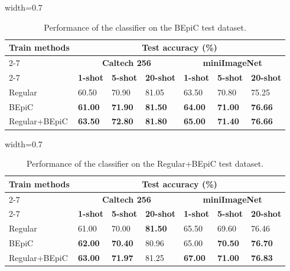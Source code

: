 \begin{table}[!ht]
\centering
\caption{Performance of the classifier on the BEpiC test dataset.}
\begin{adjustbox}{width=0.7\linewidth}
\renewcommand{\arraystretch}{1.5} 
\begin{tabular}{|l|l|l|l|l|l|l|}
 \hline
\multirow{3}{*}{\textbf{Train methods}} & \multicolumn{6}{c|}{\textbf{Test accuracy (\%)}}                         \\  \cline{2-7}
                               & \multicolumn{3}{c|}{\textbf{Caltech 256}} & \multicolumn{3}{|c|}{\textbf{miniImageNet}} \\ \cline{2-7}
                               & \textbf{1-shot}  & \textbf{5-shot}  & \textbf{20-shot} & \textbf{1-shot}    & \textbf{5-shot}   & \textbf{20-shot}   \\  \hline
Regular                        & 60.50    & 70.90    & 81.05   & 63.50      & 70.80     & 75.25     \\  \hline
BEpiC                          & \textbf{61.00}      & \textbf{71.90}    & \textbf{81.50}    & \textbf{64.00}        & \textbf{71.00}       & \textbf{76.66}     \\  \hline
Regular+BEpiC                  & \textbf{63.50}    & \textbf{72.80}    & \textbf{81.80}    & \textbf{65.00}        & \textbf{71.40}     & \textbf{76.66}    \\  \hline
\end{tabular}
\end{adjustbox}
\label{table:bepiC}
\end{table}

\begin{table}[!ht]
\centering
\caption{Performance of the classifier on the Regular+BEpiC test dataset.}
\begin{adjustbox}{width=0.7\linewidth}
\renewcommand{\arraystretch}{1.5} 
\begin{tabular}{|l|l|l|l|l|l|l|}
 \hline
\multirow{3}{*}{\textbf{Train methods}} & \multicolumn{6}{c|}{\textbf{Test accuracy (\%)}}                         \\  \cline{2-7}
                               & \multicolumn{3}{c|}{\textbf{Caltech 256}} & \multicolumn{3}{|c|}{\textbf{miniImageNet}} \\ \cline{2-7}
                               & \textbf{1-shot}  & \textbf{5-shot}  & \textbf{20-shot} & \textbf{1-shot}    & \textbf{5-shot}   & \textbf{20-shot}   \\  \hline
Regular                        & 61.00    & 70.00    & \textbf{81.50}   & 65.50  & 69.60     & 76.46     \\  \hline
BEpiC                          & \textbf{62.00}    & \textbf{70.40}  & 80.96  & 65.00    & \textbf{70.50}     & \textbf{76.70}     \\  \hline
Regular+BEpiC                  & \textbf{63.00}    & \textbf{71.97} & 81.25  & \textbf{67.00}    & \textbf{71.00}       & \textbf{76.83}    \\  \hline
\end{tabular}
\end{adjustbox}
\label{table:reg+bepiC}
\end{table}

